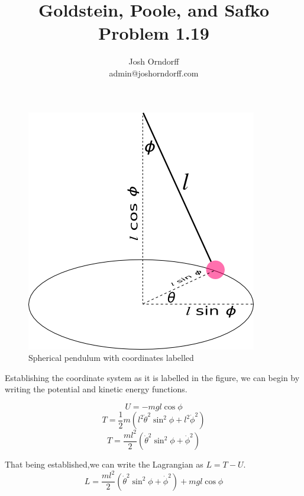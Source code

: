 \documentclass[10pt,a4paper]{article}
\begin{document}
\title{Goldstein, Poole, and Safko Problem 1.19}
\author{Josh Orndorff \\ admin@joshorndorff.com}
\maketitle

\begin{figure}[hbtpf]
\caption{Spherical pendulum with coordinates labelled}
\includegraphics[scale=.6]{Goldstein1-19.png}
\end{figure}


Establishing the coordinate system as it is labelled in the figure, we can begin by writing the potential and kinetic energy functions.

\begin{equation}
U=-mgl\cos\phi
\end{equation}
\begin{equation}
T= \frac{1}{2}m\left(l^2\dot{\theta}^2 \sin^2\phi +l^2\dot{\phi}^2\right)
\end{equation}
\begin{equation}
T= \frac{ml^2}{2}\left(\dot{\theta}^2 \sin^2\phi +\dot{\phi}^2\right)
\end{equation}

That being established,we can write the Lagrangian as $L=T-U$.
\begin{equation}
L= \frac{ml^2}{2}\left(\dot{\theta}^2 \sin^2\phi +\dot{\phi}^2\right) + mgl\cos\phi
\end{equation}
\end{document}
